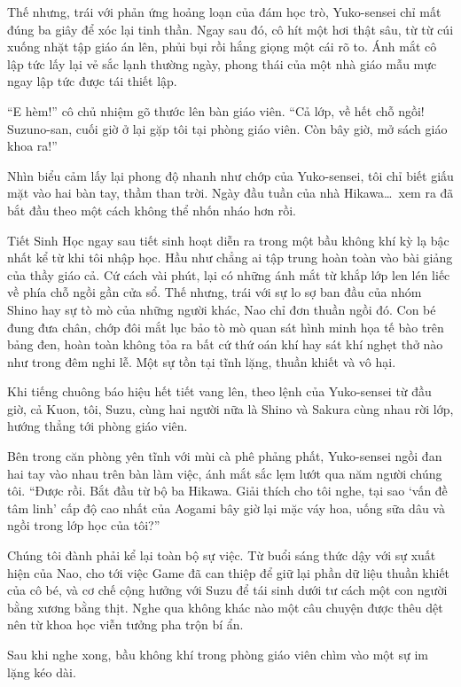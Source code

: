 \documentclass[../main.tex]{subfiles}
\begin{document}
Thế nhưng, trái với phản ứng hoảng loạn của đám học trò, Yuko-sensei chỉ mất đúng ba giây để xóc lại tinh thần. Ngay sau đó, cô hít một hơi thật sâu, từ từ cúi xuống nhặt tập giáo án lên, phủi bụi rồi hắng giọng một cái rõ to. Ánh mắt cô lập tức lấy lại vẻ sắc lạnh thường ngày, phong thái của một nhà giáo mẫu mực ngay lập tức được tái thiết lập.

``E hèm!'' cô chủ nhiệm gõ thước lên bàn giáo viên. ``Cả lớp, về hết chỗ ngồi! Suzuno-san, cuối giờ ở lại gặp tôi tại phòng giáo viên. Còn bây giờ, mở sách giáo khoa ra!''

Nhìn biểu cảm lấy lại phong độ nhanh như chớp của Yuko-sensei, tôi chỉ biết giấu mặt vào hai bàn tay, thầm than trời. Ngày đầu tuần của nhà Hikawa\dots\ xem ra đã bắt đầu theo một cách không thể nhốn nháo hơn rồi.

\ct

Tiết Sinh Học ngay sau tiết sinh hoạt diễn ra trong một bầu không khí kỳ lạ bậc nhất kể từ khi tôi nhập học. Hầu như chẳng ai tập trung hoàn toàn vào bài giảng của thầy giáo cả. Cứ cách vài phút, lại có những ánh mắt từ khắp lớp len lén liếc về phía chỗ ngồi gần cửa sổ. Thế nhưng, trái với sự lo sợ ban đầu của nhóm Shino hay sự tò mò của những người khác, Nao chỉ đơn thuần ngồi đó. Con bé đung đưa chân, chớp đôi mắt lục bảo tò mò quan sát hình minh họa tế bào trên bảng đen, hoàn toàn không tỏa ra bất cứ thứ oán khí hay sát khí nghẹt thở nào như trong đêm nghi lễ. Một sự tồn tại tĩnh lặng, thuần khiết và vô hại.

Khi tiếng chuông báo hiệu hết tiết vang lên, theo lệnh của Yuko-sensei từ đầu giờ, cả Kuon, tôi, Suzu, cùng hai người nữa là Shino và Sakura cùng nhau rời lớp, hướng thẳng tới phòng giáo viên.

Bên trong căn phòng yên tĩnh với mùi cà phê phảng phất, Yuko-sensei ngồi đan hai tay vào nhau trên bàn làm việc, ánh mắt sắc lẹm lướt qua năm người chúng tôi. ``Được rồi. Bắt đầu từ bộ ba Hikawa. Giải thích cho tôi nghe, tại sao `vấn đề tâm linh' cấp độ cao nhất của Aogami bây giờ lại mặc váy hoa, uống sữa dâu và ngồi trong lớp học của tôi?''

Chúng tôi đành phải kể lại toàn bộ sự việc. Từ buổi sáng thức dậy với sự xuất hiện của Nao, cho tới việc Game đã can thiệp để giữ lại phần dữ liệu thuần khiết của cô bé, và cơ chế cộng hưởng với Suzu để tái sinh dưới tư cách một con người bằng xương bằng thịt. Nghe qua không khác nào một câu chuyện được thêu dệt nên từ khoa học viễn tưởng pha trộn bí ẩn.

Sau khi nghe xong, bầu không khí trong phòng giáo viên chìm vào một sự im lặng kéo dài.
\end{document}
